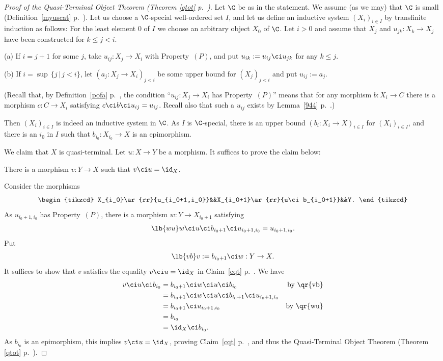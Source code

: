 \documentclass[12pt]{article}
\theoremstyle{remark}
\theoremstyle{definition}
\begin{document}
\begin{proof}[Proof of the Quasi-Terminal Object Theorem (Theorem \ref{qtot} p.~)] 
Let $\C$ be as in the statement. We assume (as we may) that $\C$ is small (Definition~\ref{myuscat} p.~). Let us choose a $\C$-special well-ordered set $I$, and let us define an inductive system $(X_i)_{i\in I}$ by transfinite induction as follows: For the least element $0$ of $I$ we choose an arbitrary object $X_0$ of $\C$. Let $i>0$ and assume that $X_j$ and $u_{jk}:X_k\to X_j$ have been constructed for $k\le j<i$. 

\nn(a) If $i=j+1$ for some $j$, take $u_{ij}:X_j\to X_i$ with Property~$(P)$, and put $u_{ik}:=u_{ij}\ci u_{jk}$ for any $k\le j$. 

\nn(b) If $i=\sup\,\{j\,|\,j<i\}$, let $(a_j:X_j\to X_i)_{j<i}$ be some upper bound for $(X_j)_{j<i}$ and put $u_{ij}:=a_j$. 

(Recall that, by Definition~\ref{pofa} p.~, the condition ``$u_{ij}:X_j\to X_i$ has Property~$(P)$'' means that for any morphism $b:X_i\to C$ there is a morphism $c:C\to X_i$ satisfying $c\ci b\ci u_{ij}=u_{ij}$. Recall also that such a $u_{ij}$ exists by Lemma~\ref{944} p.~.) 

Then $(X_i)_{i\in I}$ is indeed an inductive system in $\C$. As $I$ is $\C$-special, there is an upper bound $(b_i:X_i\to X)_{i\in I}$ for $(X_i)_{i\in I}$, and there is an $i_0$ in $I$ such that $b_{i_0}:X_{i_0}\to X$ is an epimorphism. 

We claim that $X$ is quasi-terminal. Let $u:X\to Y$ be a morphism. It suffices to prove the claim below: 
\begin{claim}
There is a morphism $v:Y\to X$ such that $v\ci u=\id_X$. 
\end{claim} 

Consider the morphisms 
$$
\begin{tikzcd}
X_{i_0}\ar{rr}{u_{i_0+1,i_0}}&&X_{i_0+1}\ar{rr}{u\ci b_{i_0+1}}&&Y.
\end{tikzcd}
$$
As $u_{i_0+1,i_0}$ has Property~$(P)$, there is a morphism $w:Y\to X_{i_0+1}$ satisfying 
\begin{equation}\lb{wu}
w\ci u\ci b_{i_0+1}\ci u_{i_0+1,i_0}=u_{i_0+1,i_0}.
\end{equation} 
Put
\begin{equation}\lb{vb}
v:=b_{i_0+1}\ci w:Y\to X.
\end{equation} 
It suffices to show that $v$ satisfies the equality $v\ci u=\id_X$ in Claim~\ref{cqt} p.~. We have 
\begin{align*}
v\ci u\ci b_{i_0}&=b_{i_0+1}\ci w\ci u\ci b_{i_0}&\text{by \qr{vb}}\\ 
&=b_{i_0+1}\ci w\ci u\ci b_{i_0+1}\ci u_{i_0+1,i_0}\\ 
&=b_{i_0+1}\ci u_{i_0+1,i_0}&\text{by \qr{wu}}\\ 
&=b_{i_0}\\ 
&=\id_X\ci b_{i_0}. 
\end{align*} 
As $b_{i_0}$ is an epimorphism, this implies $v\ci u=\id_X$, proving Claim~\ref{cqt} p.~, and thus the Quasi-Terminal Object Theorem (Theorem \ref{qtot} p.~). 
\end{proof}
\end{document}

